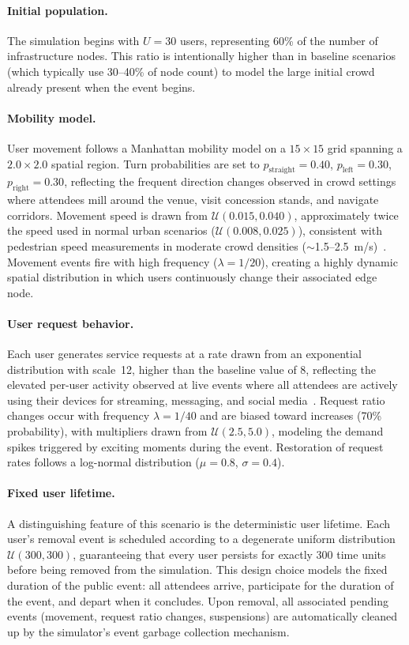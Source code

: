 \paragraph{Initial population.} The simulation begins with $U = 30$ users, representing 60\% of the number of infrastructure nodes. This ratio is intentionally higher than in baseline scenarios (which typically use 30--40\% of node count) to model the large initial crowd already present when the event begins.

\paragraph{Mobility model.} User movement follows a Manhattan mobility model on a $15 \times 15$ grid spanning a $2.0 \times 2.0$ spatial region. Turn probabilities are set to $p_{\text{straight}} = 0.40$, $p_{\text{left}} = 0.30$, $p_{\text{right}} = 0.30$, reflecting the frequent direction changes observed in crowd settings where attendees mill around the venue, visit concession stands, and navigate corridors. Movement speed is drawn from $\mathcal{U}(0.015, 0.040)$, approximately twice the speed used in normal urban scenarios ($\mathcal{U}(0.008, 0.025)$), consistent with pedestrian speed measurements in moderate crowd densities ($\sim$1.5--2.5~m/s)~\cite{Weidmann1993Transporttechnik, Helbing2000Simulating}. Movement events fire with high frequency ($\lambda = 1/20$), creating a highly dynamic spatial distribution in which users continuously change their associated edge node.

\paragraph{User request behavior.} Each user generates service requests at a rate drawn from an exponential distribution with scale~12, higher than the baseline value of 8, reflecting the elevated per-user activity observed at live events where all attendees are actively using their devices for streaming, messaging, and social media~\cite{Pujol2015Understanding}. Request ratio changes occur with frequency $\lambda = 1/40$ and are biased toward increases (70\% probability), with multipliers drawn from $\mathcal{U}(2.5, 5.0)$, modeling the demand spikes triggered by exciting moments during the event. Restoration of request rates follows a log-normal distribution ($\mu = 0.8$, $\sigma = 0.4$).

\paragraph{Fixed user lifetime.} A distinguishing feature of this scenario is the deterministic user lifetime. Each user's removal event is scheduled according to a degenerate uniform distribution $\mathcal{U}(300, 300)$, guaranteeing that every user persists for exactly 300 time units before being removed from the simulation. This design choice models the fixed duration of the public event: all attendees arrive, participate for the duration of the event, and depart when it concludes. Upon removal, all associated pending events (movement, request ratio changes, suspensions) are automatically cleaned up by the simulator's event garbage collection mechanism.


